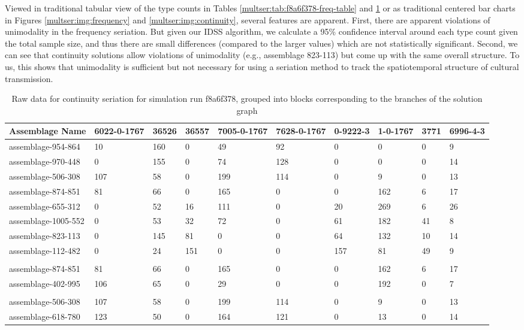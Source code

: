 Viewed in traditional tabular view of the type counts in Tables
\ref{multser:tab:f8a6f378-freq-table} and \ref{multser:tab:f8a6f378-cont-table} or as
traditional centered bar charts in Figures \ref{multser:img:frequency} and
\ref{multser:img:continuity}, several features are apparent. First, there are
apparent violations of unimodality in the frequency seriation. But given
our IDSS algorithm, we calculate a 95\% confidence interval around each
type count given the total sample size, and thus there are small
differences (compared to the larger values) which are not statistically
significant. Second, we can see that continuity solutions allow
violations of unimodality (e.g., assemblage 823-113) but come up with
the same overall structure. To us, this shows that unimodality is
sufficient but not necessary for using a seriation method to track the
spatiotemporal structure of cultural transmission.

\begin{table}
\centering
\begin{tabular}{@{}llllllllll@{}}
\toprule
Assemblage Name & 6022-0-1767 & 36526 & 36557 & 7005-0-1767 & 7628-0-1767 & 0-9222-3 & 1-0-1767 & 3771 & 6996-4-3 \\ \midrule
assemblage-954-864 & 10 & 160 & 0 & 49 & 92 & 0 & 0 & 0 & 9 \\
assemblage-970-448 & 0 & 155 & 0 & 74 & 128 & 0 & 0 & 0 & 14 \\
assemblage-506-308 & 107 & 58 & 0 & 199 & 114 & 0 & 9 & 0 & 13 \\
assemblage-874-851 & 81 & 66 & 0 & 165 & 0 & 0 & 162 & 6 & 17 \\
assemblage-655-312 & 0 & 52 & 16 & 111 & 0 & 20 & 269 & 6 & 26 \\
assemblage-1005-552 & 0 & 53 & 32 & 72 & 0 & 61 & 182 & 41 & 8 \\
assemblage-823-113 & 0 & 145 & 81 & 0 & 0 & 64 & 132 & 10 & 14 \\
assemblage-112-482 & 0 & 24 & 151 & 0 & 0 & 157 & 81 & 49 & 9 \\
 &  &  &  &  &  &  &  &  &  \\
assemblage-874-851 & 81 & 66 & 0 & 165 & 0 & 0 & 162 & 6 & 17 \\
assemblage-402-995 & 106 & 65 & 0 & 29 & 0 & 0 & 192 & 0 & 7 \\
 &  &  &  &  &  &  &  &  &  \\
assemblage-506-308 & 107 & 58 & 0 & 199 & 114 & 0 & 9 & 0 & 13 \\
assemblage-618-780 & 123 & 50 & 0 & 164 & 121 & 0 & 13 & 0 & 14 \\ \bottomrule
\end{tabular}
\caption{Raw data for continuity seriation for simulation run f8a6f378, grouped into blocks corresponding to the branches of the solution graph}
\label{multser:tab:f8a6f378-cont-table}
\end{table}

